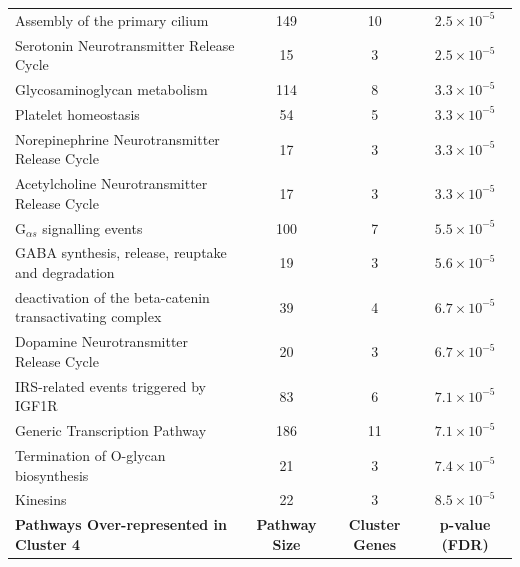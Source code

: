 \begin{table}[!hp]
{\begin{threeparttable}
\begin{tabular}{lccc}
  \rowcolor{Cluster_Orange!30}
  Assembly of the primary cilium & 149 &  10 & $2.5 \times 10^{-5}$ \\ 
  \rowcolor{Cluster_Orange!20}
  Serotonin Neurotransmitter Release Cycle &  15 &   3 & $2.5 \times 10^{-5}$ \\ 
  \rowcolor{Cluster_Orange!30}
  Glycosaminoglycan metabolism & 114 &   8 & $3.3 \times 10^{-5}$ \\ 
  \rowcolor{Cluster_Orange!20}
  Platelet homeostasis &  54 &   5 & $3.3 \times 10^{-5}$ \\ 
  \rowcolor{Cluster_Orange!30}
  Norepinephrine Neurotransmitter Release Cycle &  17 &   3 & $3.3 \times 10^{-5}$ \\ 
  \rowcolor{Cluster_Orange!20}
  Acetylcholine Neurotransmitter Release Cycle &  17 &   3 & $3.3 \times 10^{-5}$ \\ 
  \rowcolor{Cluster_Orange!30}
  G$_{\alpha s}$ signalling events & 100 &   7 & $5.5 \times 10^{-5}$ \\ 
  \rowcolor{Cluster_Orange!20}
  GABA synthesis, release, reuptake and degradation &  19 &   3 & $5.6 \times 10^{-5}$ \\ 
  \rowcolor{Cluster_Orange!30}
  deactivation of the beta-catenin transactivating complex &  39 &   4 & $6.7 \times 10^{-5}$ \\ 
  \rowcolor{Cluster_Orange!20}
  Dopamine Neurotransmitter Release Cycle &  20 &   3 & $6.7 \times 10^{-5}$ \\ 
  \rowcolor{Cluster_Orange!30}
  IRS-related events triggered by IGF1R &  83 &   6 & $7.1 \times 10^{-5}$ \\ 
  \rowcolor{Cluster_Orange!20}
  Generic Transcription Pathway & 186 &  11 & $7.1 \times 10^{-5}$ \\ 
  \rowcolor{Cluster_Orange!30}
  Termination of O-glycan biosynthesis &  21 &   3 & $7.4 \times 10^{-5}$ \\ 
  \rowcolor{Cluster_Orange!20}
  Kinesins &  22 &   3 & $8.5 \times 10^{-5}$ \\ 
  \hline
  \cellcolor{white} \large{\textbf{Pathways Over-represented in Cluster 4}} & \large{\textbf{Pathway Size}} & \large{\textbf{Cluster Genes}} & \large{\textbf{p-value (\gls{FDR})}} \\ %

\end{tabular}
\end{threeparttable}}
\end{table}
